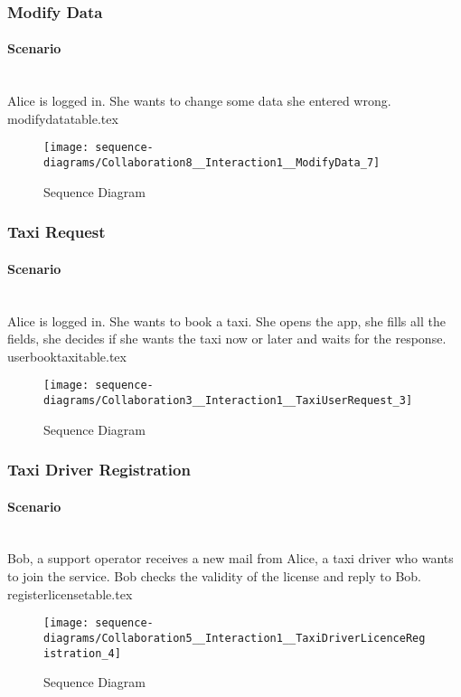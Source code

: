 \subsubsection{Modify Data} 
\label{ssub:modify_scenario}
\paragraph{Scenario} \hfill \\
Alice is logged in. She wants to change some data she entered wrong. 
{modifydatatable.tex}
\newpage
\vfill
\begin{figure}
\caption{Sequence Diagram}
\texttt{[image: sequence-diagrams/Collaboration8\_\_Interaction1\_\_ModifyData\_7]}
\centering
\end{figure}
\vfill
\clearpage

\subsubsection{Taxi Request} 
\label{ssub:taxirequest_scenario}
\paragraph{Scenario} \hfill \\
Alice is logged in. She wants to book a taxi. She opens the app, she fills all the fields, she decides if she wants the taxi now or later and waits for the response.\\

{userbooktaxitable.tex}
\newpage
\vfill
\begin{figure}
\caption{Sequence Diagram}
\texttt{[image: sequence-diagrams/Collaboration3\_\_Interaction1\_\_TaxiUserRequest\_3]}
\centering
\end{figure}
\vfill
\clearpage

\subsubsection{Taxi Driver Registration} 
\label{ssub:taxidriverregisration_scenario}
\paragraph{Scenario} \hfill \\
Bob, a support operator receives a new mail from Alice, a taxi driver who wants to join the service. Bob checks the validity of the license and reply to Bob.
{registerlicensetable.tex}
\newpage
\vfill
\begin{figure}
\caption{Sequence Diagram}
\texttt{[image: sequence-diagrams/Collaboration5\_\_Interaction1\_\_TaxiDriverLicenceRegistration\_4]}
\centering
\end{figure}
\vfill
\clearpage

